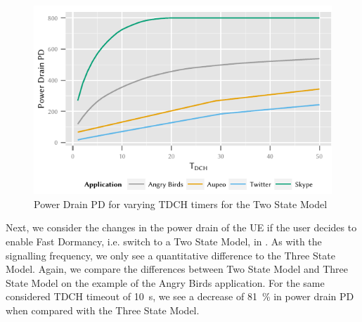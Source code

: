 \begin{figure}
	\centering
	\includegraphics{network/network_traces/numerical_results/figures/2_state_tdch_vs_power_drain}
	\caption{Power Drain \gls{PD} for varying \gls{TDCH} timers for the Two State Model}\label{fig:network:network_traces:numerical_results:two_states:power_drain}
\end{figure}
Next, we consider the changes in the power drain of the \gls{UE} if the user decides to enable Fast Dormancy, i.e. switch to a Two State Model, in .
As with the signalling frequency, we only see a quantitative difference to the Three State Model.
Again, we compare the differences between Two State Model and Three State Model on the example of the Angry Birds application.
For the same considered \gls{TDCH} timeout of \SI{10}{\second}, we see a decrease of \SI{81}{\percent} in power drain \gls{PD} when compared with the Three State Model.

